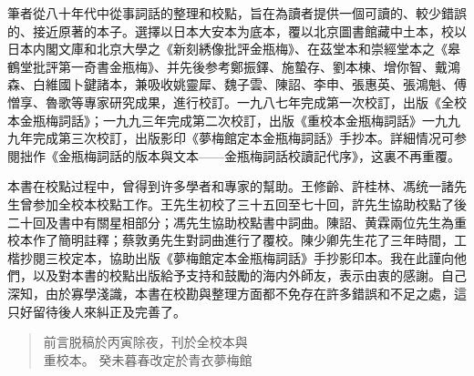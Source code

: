 筆者從八十年代中從事詞話的整理和校點，旨在為讀者提供一個可讀的、較少錯誤的、接近原著的本子。選擇以日本大安本为底本，覆以北京圖書館藏中土本，校以日本内閣文庫和北京大學之《新刻綉像批評金瓶梅》、在茲堂本和崇經堂本之《皋鶴堂批評第一奇書金瓶梅》、并先後参考鄭振鐸、施蟄存、劉本棟、增你智、戴鴻森、白維國卜鍵諸本，兼吸收姚靈犀、魏子雲、陳詔、李申、張惠英、張鴻魁、傅憎享、魯歌等專家研究成果，進行校訂。一九八七年完成第一次校訂，出版《全校本金瓶梅詞話》；一九九三年完成第二次校訂，出版《重校本金瓶梅詞話》一九九九年完成第三次校訂，出版影印《夢梅館定本金瓶梅詞話》手抄本。詳細情况可参閱拙作《金瓶梅詞話的版本與文本——金瓶梅詞話校讀記代序》，这裏不再重覆。

本書在校點过程中，曾得到许多學者和專家的幫助。王修齡、許桂林、馮统一諸先生曾参加全校本校點工作。王先生初校了三十五回至七十回，許先生協助校點了後二十回及書中有關星相部分；馮先生協助校點書中詞曲。陳詔、黄霖兩位先生為重校本作了簡明註釋；蔡敦勇先生對詞曲進行了覆校。陳少卿先生花了三年時間，工楷抄閱三校定本，協助出版《夢梅館定本金瓶梅詞話》手抄影印本。我在此謹向他們，以及對本書的校點出版給予支持和鼓勵的海内外師友，表示由衷的感謝。自己深知，由於寡學淺識，本書在校勘與整理方面都不免存在許多錯誤和不足之處，這只好留待後人來糾正及完善了。

\begin{quotation}
\begin{flushright}

\nopagebreak 前言脱稿於丙寅除夜，刊於全校本與\\重校本。
癸未暮春改定於青衣夢梅館

\end{flushright}
\end{quotation}

\setcounter{footnote}{0}

